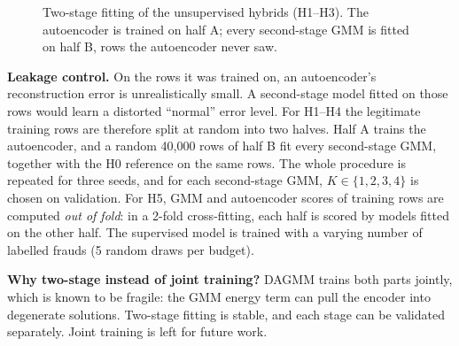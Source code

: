 \documentclass[12pt]{article}
\begin{document}
\begin{figure}[H]
\centering
{}
\caption{Two-stage fitting of the unsupervised hybrids (H1--H3). The autoencoder is trained on half A; every
second-stage GMM is fitted on half B, rows the autoencoder never saw.}
\label{fig:hyb-pipe}
\end{figure}

\textbf{Leakage control.} On the rows it was trained on, an autoencoder's reconstruction error is unrealistically
small. A second-stage model fitted on those rows would learn a distorted ``normal'' error level. For H1--H4 the
legitimate training rows are therefore split at random into two halves. Half A trains the autoencoder, and a random
40{,}000 rows of half B fit every second-stage GMM, together with the H0 reference on the same rows. The whole procedure
is repeated for three seeds, and for each second-stage GMM, $K\in\{1,2,3,4\}$ is chosen on validation. For H5, GMM and
autoencoder scores of training rows are computed \emph{out of fold}: in a 2-fold cross-fitting, each half is scored by
models fitted on the other half. The supervised model is trained with a varying number of labelled frauds (5 random
draws per budget).

\textbf{Why two-stage instead of joint training?} DAGMM trains both parts jointly, which is known to be fragile: the GMM
energy term can pull the encoder into degenerate solutions. Two-stage fitting is stable, and each stage can be
validated separately. Joint training is left for future work.
\end{document}
